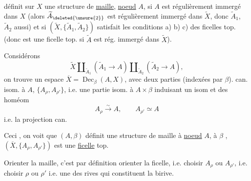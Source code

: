 
définit sur $X$ une structure de  \uline{maille},  \uline{noeud} $A$, si   $A$ est régulièrement immergé dans $X$ (alors $\widetilde A_{\deleted{\unsure{2}}}$ est régulièrement immergé dans $\widetilde X$, donc $\widetilde A_1$, $\widetilde A_2$ aussi) et si $(\widetilde X,\{\widetilde A_1,\widetilde A_2\})$ satisfait les conditions a) b) c) des ficelles top. (donc est une ficelle top. si $\widetilde A$ est rég. immergé dans $\widetilde X$).

Considérons
\[
\widetilde X\amalg_{\widetilde A_1}(\widetilde A_1\longrightarrow A)
\amalg_{\widetilde A_2}(\widetilde A_2\longrightarrow A),
\]
on trouve un espace $\overline X=\operatorname{Dec}_{\beta}(A,X)$, avec deux parties (indexées par $\beta$). can. isom. à $A$, $\{A_\rho,A_{\rho'}\}$,  i.e. une partie isom. à $A\times\beta$
induisant un isom
et des homéom
\[
A_\rho\overset{\sim}{\longrightarrow} A,\qquad A_{\rho'}\simeq A
\]
i.e. la projection can.



Ceci , on voit que $(A,\beta)$ définit une structure de maille à  \uline{noeud} $A$, à  $\beta$ \deleted{$\unsure{\epsilon}$},  $(\overline X,\{A_\rho,A_{\rho'}\})$ est une \uline{ficelle} top.

Orienter la maille, c'est par définition orienter la ficelle, i.e. choisir $A_\rho$ ou $A_{\rho'}$, i.e. choisir $\rho$ ou $\rho'$ i.e. une des rives qui constituent la birive.

